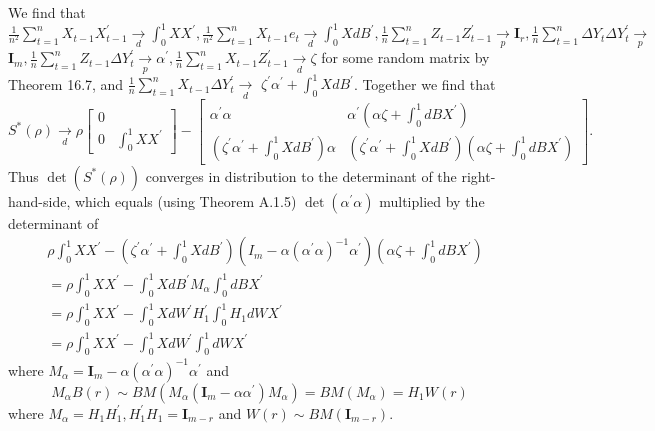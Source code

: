 \documentclass[10pt]{article}
\begin{document}
We find that $\frac{1}{n^{2}} \sum_{t=1}^{n} X_{t-1} X_{t-1}^{\prime} \underset{d}{\longrightarrow} \int_{0}^{1} X X^{\prime}, \frac{1}{n^{2}} \sum_{t=1}^{n} X_{t-1} e_{t} \underset{d}{\longrightarrow} \int_{0}^{1} X d B^{\prime}, \frac{1}{n} \sum_{t=1}^{n} Z_{t-1} Z_{t-1}^{\prime} \underset{p}{\longrightarrow} \boldsymbol{I}_{r}, \frac{1}{n} \sum_{t=1}^{n} \Delta Y_{t} \Delta Y_{t}^{\prime} \underset{p}{\longrightarrow}$ $\boldsymbol{I}_{m}, \frac{1}{n} \sum_{t=1}^{n} Z_{t-1} \Delta Y_{t}^{\prime} \underset{p}{\longrightarrow} \alpha^{\prime}, \frac{1}{n} \sum_{t=1}^{n} X_{t-1} Z_{t-1}^{\prime} \underset{d}{\longrightarrow} \zeta$ for some random matrix by Theorem 16.7, and $\frac{1}{n} \sum_{t=1}^{n} X_{t-1} \Delta Y_{t}^{\prime} \underset{d}{\longrightarrow}$ $\zeta^{\prime} \alpha^{\prime}+\int_{0}^{1} X d B^{\prime}$. Together we find that
$$
S^{*}(\rho) \underset{d}{\longrightarrow} \rho\left[\begin{array}{cc}
0 & \\
0 & \int_{0}^{1} X X^{\prime}
\end{array}\right]-\left[\begin{array}{cc}
\alpha^{\prime} \alpha & \alpha^{\prime}\left(\alpha \zeta+\int_{0}^{1} d B X^{\prime}\right) \\
\left(\zeta^{\prime} \alpha^{\prime}+\int_{0}^{1} X d B^{\prime}\right) \alpha & \left(\zeta^{\prime} \alpha^{\prime}+\int_{0}^{1} X d B^{\prime}\right)\left(\alpha \zeta+\int_{0}^{1} d B X^{\prime}\right)
\end{array}\right] .
$$
Thus $\operatorname{det}\left(S^{*}(\rho)\right)$ converges in distribution to the determinant of the right-hand-side, which equals (using Theorem A.1.5) $\operatorname{det}\left(\alpha^{\prime} \alpha\right)$ multiplied by the determinant of
$$
\begin{aligned}
&\rho \int_{0}^{1} X X^{\prime}-\left(\zeta^{\prime} \alpha^{\prime}+\int_{0}^{1} X d B^{\prime}\right)\left(I_{m}-\alpha\left(\alpha^{\prime} \alpha\right)^{-1} \alpha^{\prime}\right)\left(\alpha \zeta+\int_{0}^{1} d B X^{\prime}\right) \\
&=\rho \int_{0}^{1} X X^{\prime}-\int_{0}^{1} X d B^{\prime} M_{\alpha} \int_{0}^{1} d B X^{\prime} \\
&=\rho \int_{0}^{1} X X^{\prime}-\int_{0}^{1} X d W^{\prime} H_{1}^{\prime} \int_{0}^{1} H_{1} d W X^{\prime} \\
&=\rho \int_{0}^{1} X X^{\prime}-\int_{0}^{1} X d W^{\prime} \int_{0}^{1} d W X^{\prime}
\end{aligned}
$$
where $M_{\alpha}=\boldsymbol{I}_{m}-\alpha\left(\alpha^{\prime} \alpha\right)^{-1} \alpha^{\prime}$ and
$$
M_{\alpha} B(r) \sim B M\left(M_{\alpha}\left(\boldsymbol{I}_{m}-\alpha \alpha^{\prime}\right) M_{\alpha}\right)=B M\left(M_{\alpha}\right)=H_{1} W(r)
$$
where $M_{\alpha}=H_{1} H_{1}^{\prime}, H_{1}^{\prime} H_{1}=\boldsymbol{I}_{m-r}$ and $W(r) \sim B M\left(\boldsymbol{I}_{m-r}\right)$.
\end{document}
